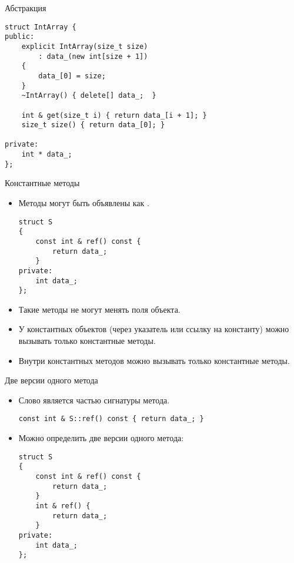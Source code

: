 \documentclass{beamer}
\begin{document}
\begin{frame}[fragile]{Абстракция}{}
\begin{lstlisting}
struct IntArray {
public:
    explicit IntArray(size_t size) 
        : data_(new int[size + 1]) 
    {
        data_[0] = size;
    }
    ~IntArray() { delete[] data_;  }

    int & get(size_t i) { return data_[i + 1]; }
    size_t size() { return data_[0]; }

private:
    int * data_;
};
\end{lstlisting}
\end{frame}

\begin{frame}[fragile]{Константные методы}{}
    \begin{itemize}
        \item Методы могут быть объявлены как .
\begin{lstlisting}
struct S
{
    const int & ref() const {
        return data_;
    }
private:
    int data_;
};
\end{lstlisting}
        \item Такие методы не могут менять поля объекта.
        \item У константных объектов (через указатель или ссылку на константу)
            можно вызывать только константные методы.
        \item Внутри константных методов можно вызывать только константные методы.
    \end{itemize}
\end{frame}

\begin{frame}[fragile]{Две версии одного метода}{}
    \begin{itemize}
        \item Слово  является частью сигнатуры метода.
        \begin{lstlisting}
const int & S::ref() const { return data_; }
        \end{lstlisting}
        \item Можно определить две версии одного метода:
        \begin{lstlisting}
struct S
{
    const int & ref() const {
        return data_;
    }
    int & ref() {
        return data_;
    }
private:
    int data_;
};
        \end{lstlisting}
    \end{itemize}
\end{frame}
\end{document}
